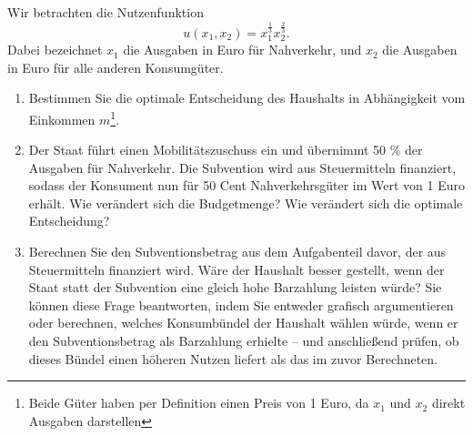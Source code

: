 \begin{question}[subtitle={Cobb-Douglas-Präferenzen}]
	Wir betrachten die Nutzenfunktion
	\[
		u(x_1,x_2) = x_1^{\frac{1}{3}} x_2^{\frac{2}{3}}
		.\]
	Dabei bezeichnet $x_1$ die Ausgaben in Euro für Nahverkehr, und $x_2$ die Ausgaben in Euro für
	alle anderen Konsumgüter.
	\begin{enumerate}
		\item Bestimmen Sie die optimale Entscheidung des Haushalts in Abhängigkeit vom Einkommen $m$\footnote{Beide Güter haben per Definition einen Preis von 1 Euro, da $x_1$ und $x_2$ direkt Ausgaben darstellen}.
		\item Der Staat führt einen Mobilitätszuschuss ein und übernimmt 50 \% der Ausgaben für Nahverkehr.
		      Die Subvention wird aus Steuermitteln finanziert, sodass der Konsument nun für 50 Cent Nahverkehrsgüter im Wert von 1 Euro erhält. Wie verändert sich die Budgetmenge?
		      Wie verändert sich die optimale Entscheidung?
		\item Berechnen Sie den Subventionsbetrag aus dem Aufgabenteil davor, der aus Steuermitteln finanziert wird.
		      Wäre der Haushalt besser gestellt, wenn der Staat statt der Subvention eine gleich hohe Barzahlung leisten würde? Sie können diese Frage beantworten, indem Sie entweder grafisch argumentieren oder berechnen, welches Konsumbündel der Haushalt wählen würde, wenn er den Subventionsbetrag als Barzahlung erhielte – und anschließend prüfen, ob dieses Bündel einen höheren Nutzen liefert als das
		      im zuvor Berechneten.
	\end{enumerate}
\end{question}

